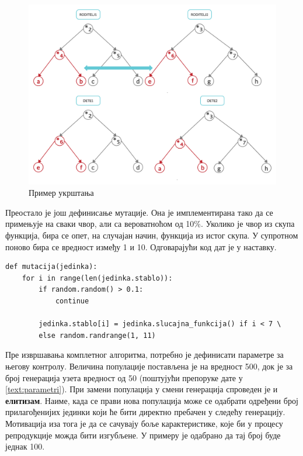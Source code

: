 \documentclass[a4paper]{article}
\begin{document}
\begin{figure}[ht!]
    \begin{center}
    \includegraphics[scale=0.16]{ukrstanje.png}
    \end{center}
    \caption{Пример укрштања}
    \label{fig:ukrstanje}
\end{figure}

Преостало је још дефинисање мутације. Она је имплементирана тако да се примењује на сваки чвор, али са вероватноћом од 10\%.
Уколико је чвор из скупа функција, бира се опет, на случајан начин, функција из истог скупа. У супротном поново бира се вредност између 1 и 10. Одговарајући код дат је у наставку.

\bigskip
\bigskip
\begin{lstlisting}[frame=single]
def mutacija(jedinka):
    for i in range(len(jedinka.stablo)):
        if random.random() > 0.1:
            continue

        jedinka.stablo[i] = jedinka.slucajna_funkcija() if i < 7 \
        else random.randrange(1, 11)
\end{lstlisting}

Пре извршавања комплетног алгоритма, потребно је дефинисати параметре за његову контролу. Величина популације постављена је на вредност 500, док је за број генерација узета вредност од 50 (поштујући препоруке дате у \ref{text:parametri}). При замени популација у смени генерација спроведен је и \textbf{елитизам}. Наиме, када се прави нова популација може се одабрати одређени број прилагођенијих јединки који ће бити директно пребачен у следећу генерацију. Мотивација иза тога је да се сачувају боље карактеристике, које би у процесу репродукције можда бити изгубљене. У примеру је одабрано да тај број буде једнак 100. \newline
\end{document}
